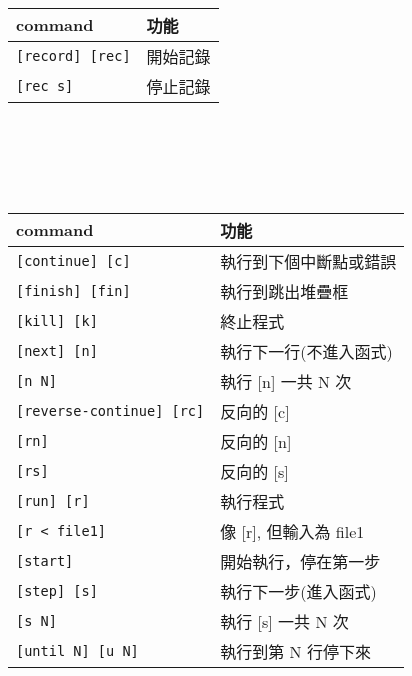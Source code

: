 \begin{center}
     \\
    \begin{tabular}{|p{2.7cm}|p{2.7cm}|}
        \hline
        command                         & 功能 \\
        \hline
        \verb|[record] [rec]|           & 開始記錄 \\
        \verb|[rec s]|                  & 停止記錄 \\
        \hline
    \end{tabular} \\
    \hspace{\fill} \\
    \hspace{\fill} \\

     \\
    \begin{tabular}{|p{2.7cm}|p{2.7cm}|}
        \hline
        command                         & 功能 \\
        \hline
        \verb|[continue] [c]|           & 執行到下個中斷點或錯誤 \\
        \verb|[finish] [fin]|           & 執行到跳出堆疊框 \\
        \verb|[kill] [k]|               & 終止程式 \\
        \verb|[next] [n]|               & 執行下一行(不進入函式) \\
        \verb|[n N]|                    & 執行 [n] 一共 N 次 \\
        \verb|[reverse-continue] [rc]|  & 反向的 [c] \\
        \verb|[rn]|                     & 反向的 [n] \\
        \verb|[rs]|                     & 反向的 [s] \\
        \verb|[run] [r]|                & 執行程式 \\
        \verb|[r < file1]|              & 像 [r], 但輸入為 file1 \\
        \verb|[start]|                  & 開始執行，停在第一步 \\
        \verb|[step] [s]|               & 執行下一步(進入函式) \\
        \verb|[s N]|                    & 執行 [s] 一共 N 次 \\
        \verb|[until N] [u N]|          & 執行到第 N 行停下來 \\
        \hline
    \end{tabular} \\
    \hspace{\fill} \\
    \hspace{\fill} \\


\end{center}

